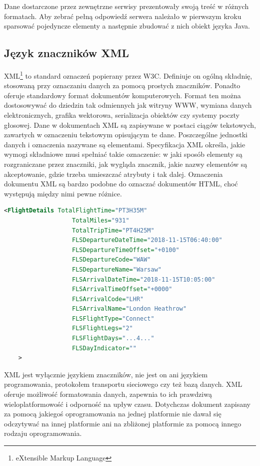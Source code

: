 \documentclass[12pt, twoside]{report}
\begin{document}
Dane dostarczone przez zewnętrzne serwisy prezentowały swoją treść w różnych formatach. Aby zebrać pełną odpowiedź serwera należało w pierwszym kroku sparsować pojedyncze elementy a następnie zbudować z nich obiekt języka Java.
\subsection{Język znaczników XML}
XML\footnote{eXtensible Markup Language} to standard oznaczeń popierany przez W3C. Definiuje on ogólną składnię, stosowaną przy oznaczaniu danych za pomocą prostych znaczników.\cite{xml} Ponadto oferuje standardowy format dokumentów komputerowych. Format ten można dostosowywać do dziedzin tak odmiennych jak witryny WWW, wymiana danych elektronicznych, grafika wektorowa, serializacja obiektów czy systemy poczty głosowej. Dane w dokumentach XML są zapisywane w postaci ciągów tekstowych, zawartych w oznaczeniu tekstowym opisującym te dane. Poszczególne jednostki danych i oznaczenia nazywane są elementami. Specyfikacja XML określa, jakie wymogi składniowe musi spełniać takie oznaczenie: w jaki sposób elementy są rozgraniczane przez znaczniki, jak wygląda znacznik, jakie nazwy elementów są akceptowanie, gdzie trzeba umieszczać atrybuty i tak dalej. Oznaczenia dokumentu XML są bardzo podobne do oznaczać dokumentów HTML, choć występują między nimi pewne różnice.

\begin{lstlisting}[language=XML, caption=Fragment danych w formacie XML]
    <FlightDetails TotalFlightTime="PT3H35M"
                   TotalMiles="931"
                   TotalTripTime="PT4H25M"
                   FLSDepartureDateTime="2018-11-15T06:40:00"
                   FLSDepartureTimeOffset="+0100"
                   FLSDepartureCode="WAW"
                   FLSDepartureName="Warsaw"
                   FLSArrivalDateTime="2018-11-15T10:05:00"
                   FLSArrivalTimeOffset="+0000"
                   FLSArrivalCode="LHR"
                   FLSArrivalName="London Heathrow"
                   FLSFlightType="Connect"
                   FLSFlightLegs="2"
                   FLSFlightDays="...4..."
                   FLSDayIndicator=""
    >
\end{lstlisting}
\newpage
XML jest wyłącznie językiem znaczników, nie jest on ani językiem programowania, protokołem transportu sieciowego czy też bazą danych. XML oferuje możliwość formatowania danych, zapewnia to ich prawdziwą wieloplatformowość i odporność na upływ czasu. Dotychczas dokument zapisany za pomocą jakiegoś oprogramowania na jednej platformie nie dawał się odczytywać na innej platformie ani na zbliżonej platformie za pomocą innego rodzaju oprogramowania. 
\end{document}
